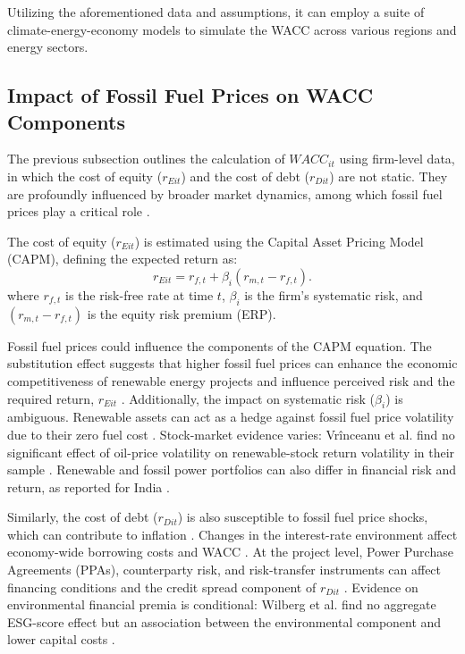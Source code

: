 Utilizing the aforementioned data and assumptions, it can employ a suite of climate-energy-economy models to simulate the WACC across various regions and energy sectors.

\subsection{Impact of Fossil Fuel Prices on WACC Components}

The previous subsection outlines the calculation of $WACC_{it}$ using firm-level data, in which the cost of equity ($r_{Eit}$) and the cost of debt ($r_{Dit}$) are not static. They are profoundly influenced by broader market dynamics, among which fossil fuel prices play a critical role \cite{melodia2022energy}.

The cost of equity ($r_{Eit}$) is estimated using the Capital Asset Pricing Model (CAPM), defining the expected return as:
\begin{equation}
r_{Eit}=r_{f,t}+\beta_i(r_{m,t}-r_{f,t}).
\end{equation}
where $r_{f,t}$ is the risk-free rate at time $t$, $\beta_i$ is the firm's systematic risk, and $(r_{m,t}-r_{f,t})$ is the equity risk premium (ERP).

Fossil fuel prices could influence the components of the CAPM equation. The substitution effect suggests that higher fossil fuel prices can enhance the economic competitiveness of renewable energy projects and influence perceived risk and the required return, $r_{Eit}$ \cite{Lieberman2007RenewableHedge}. Additionally, the impact on systematic risk ($\beta_i$) is ambiguous. Renewable assets can act as a hedge against fossil fuel price volatility due to their zero fuel cost \cite{Lieberman2007RenewableHedge}. Stock-market evidence varies: Vr\^inceanu et al. find no significant effect of oil-price volatility on renewable-stock return volatility in their sample \cite{vrinceanu2020influence}. Renewable and fossil power portfolios can also differ in financial risk and return, as reported for India \cite{su13052573}.

Similarly, the cost of debt ($r_{Dit}$) is also susceptible to fossil fuel price shocks, which can contribute to inflation \cite{melodia2022energy,millischer2024renewables}. Changes in the interest-rate environment affect economy-wide borrowing costs and WACC \cite{dobrowolski2022weighted}. At the project level, Power Purchase Agreements (PPAs), counterparty risk, and risk-transfer instruments can affect financing conditions and the credit spread component of $r_{Dit}$ \cite{duma2023risk}. Evidence on environmental financial premia is conditional: Wilberg et al. find no aggregate ESG-score effect but an association between the environmental component and lower capital costs \cite{kjellevoll2023impact}.

